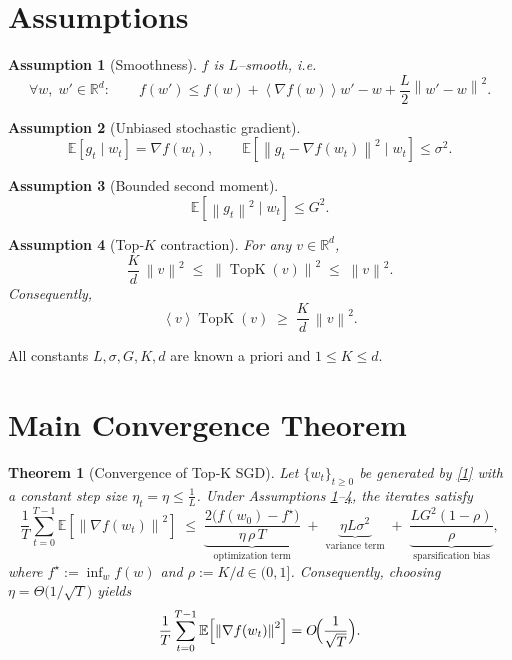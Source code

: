 \documentclass{article}
\newtheorem{theorem}{Theorem}
\newtheorem{assumption}{Assumption}
\newcommand{\E}{\mathbb{E}}
\newcommand{\norm}[1]{\left\|#1\right\|}
\newcommand{\inner}[1]{\left\langle #1 \right\rangle}
\newcommand{\TopK}{\operatorname{TopK}}
\newcommand{\R}{\mathbb{R}}
\begin{document}
\newpage

\section*{Assumptions}
\begin{assumption}[Smoothness]\label{ass:smooth}
$f$ is $L$–smooth, i.e.
\[
\forall w,\; w' \in\R^{d}:\qquad 
f(w')\le f(w)+\inner{\nabla f(w)}{w'-w}+\frac{L}{2}\norm{w'-w}^2 .
\]
\end{assumption}
\begin{assumption}[Unbiased stochastic gradient]\label{ass:unbiased}
\[
\E\!\left[g_t\mid w_t\right]=\nabla f(w_t),\qquad 
\E\!\left[\norm{g_t-\nabla f(w_t)}^2\mid w_t\right]\le\sigma^2 .
\]
\end{assumption}
\begin{assumption}[Bounded second moment]\label{ass:bounded}
\[
\E\!\left[\norm{g_t}^2\mid w_t\right]\le G^2 .
\]
\end{assumption}
\begin{assumption}[Top‑$K$ contraction]\label{ass:contract}
For any $v\in\R^{d}$,
\[
\frac{K}{d}\,\norm{v}^2\;\le\;\norm{\TopK(v)}^2\;\le\;\norm{v}^2 .
\tag{2}
\]
Consequently,
\[
\inner{v}{\TopK(v)}\;\ge\;\frac{K}{d}\,\norm{v}^2 .
\tag{3}
\]
\end{assumption}
All constants $L,\sigma,G,K,d$ are known a priori and $1\le K\le d$.

\section*{Main Convergence Theorem}
\begin{theorem}[Convergence of Top‑K SGD]\label{thm:main}
Let $\{w_t\}_{t\ge0}$ be generated by \eqref{1} with a constant step size 
$\eta_t=\eta\le \frac{1}{L}$.  
Under Assumptions \ref{ass:smooth}–\ref{ass:contract}, the iterates satisfy
\[
\frac{1}{T}\sum_{t=0}^{T-1}
\E\!\left[\norm{\nabla f(w_t)}^2\right]
\;\le\;
\underbrace{\frac{2\bigl(f(w_0)-f^\star\bigr)}{\eta\,\rho\,T}}_{\text{optimization term}}
\;+\;
\underbrace{ \eta L\sigma^2}_{\text{variance term}}
\;+\;
\underbrace{ \frac{L G^2(1-\rho)}{\rho}}_{\text{sparsification bias}} ,
\tag{4}
\]
where $f^\star:=\inf_{w}f(w)$ and $\rho:=K/d\in(0,1]$.
Consequently, choosing $\eta = \Theta\!\bigl(1/\sqrt{T}\bigr)$ yields
\[
\frac{1}{T}\sum_{t=0}^{T-1}
\E\!\left[\norm{\nabla f(w_t)}^2\right]
= O\!\Bigl(\frac{1}{\sqrt{T}}\Bigr) .
\]
\end{theorem}
\end{document}
